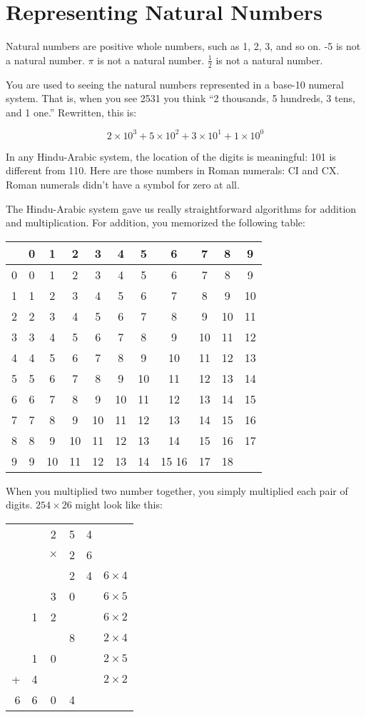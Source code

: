 \chapter{Representing Natural Numbers}

Natural numbers are positive whole numbers, such as 1, 2, 3, and so on.  -5 is not a natural
number.  $\pi$ is not a natural number. $\frac{1}{2}$ is not a natural
number.

You are used to seeing the natural numbers represented in a base-10
 numeral system.  That is, when you see 2531 you
think ``2 thousands, 5 hundreds, 3 tens, and 1 one.''  Rewritten, this is:

$$2 \times 10^3 + 5 \times 10^2 + 3 \times 10^1 + 1 \times 10^0$$

In any Hindu-Arabic system, the location of the digits is meaningful:
101 is different from 110.  Here are those numbers in Roman numerals:
CI and CX.  Roman numerals didn't have a symbol for zero at all.

The Hindu-Arabic system gave us really straightforward algorithms for
addition and multiplication.  For addition, you memorized the following table:

\begin{tabular}{ c || c | c | c | c | c | c| c| c| c| c }
  & 0 & 1 & 2 & 3 & 4 & 5 & 6 & 7 & 8 & 9 \\
  \hline
0 & 0 & 1 & 2 & 3 & 4 & 5 & 6 & 7 & 8 & 9 \\
1 & 1 & 2 & 3 & 4 & 5 & 6 & 7 & 8 & 9 & 10 \\
2 & 2 & 3 & 4 & 5 & 6 & 7 & 8 & 9 & 10 & 11\\
3 & 3 & 4 & 5 & 6 & 7 & 8 & 9 & 10 & 11 & 12\\
4 & 4 & 5 & 6 & 7 & 8 & 9 & 10 & 11 & 12 & 13\\
5 & 5 & 6 & 7 & 8 & 9 & 10 & 11 & 12 & 13 & 14\\
6 & 6 & 7 & 8 & 9 & 10 & 11 & 12 & 13 & 14 & 15\\
7 & 7 & 8 & 9 & 10 & 11 & 12 & 13 & 14 & 15 & 16\\
8 & 8 & 9 & 10 & 11 & 12 & 13 & 14 & 15 & 16 & 17\\
9 & 9 & 10 & 11 & 12 & 13 & 14 & 15 16 & 17 & 18\\
\end{tabular}

When you multiplied two number together, you simply multiplied each
pair of digits. $254 \times 26$  might look like this:

\begin{tabular} {r c c c c | c}
 & & 2 & 5 & 4 & \\
 & & $\times$  & 2 & 6 & \\
  \hline
&  &   & 2 & 4 & $6 \times 4$\\
&  & 3 & 0 & & $6 \times 5$  \\
&  1 & 2 & & & $6 \times 2$  \\
&  &  &  8 & & $2 \times 4$ \\
& 1 & 0 & & & $2 \times 5$\\
+ & 4 &  & & & $2 \times 2$\\
 \hline
 6 & 6 & 0 & 4
 \end{tabular}
  

